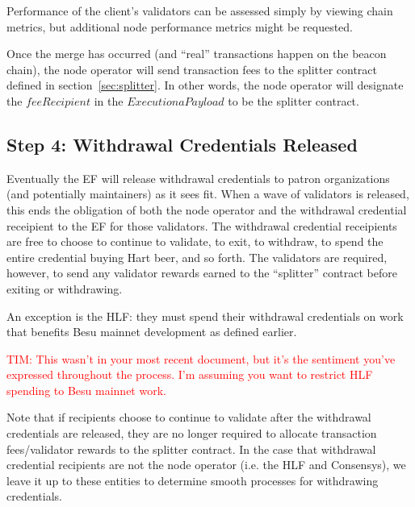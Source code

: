 Performance of the client’s validators can be assessed simply by viewing chain metrics, but additional node performance metrics might be requested.

Once the merge has occurred (and ``real'' transactions happen on the beacon chain), the node operator will send transaction fees to the splitter contract defined in section~\ref{sec:splitter}. In other words, the node operator will designate the $feeRecipient$ in the $ExecutionaPayload$ to be the splitter contract.

\subsection{Step 4:  Withdrawal Credentials Released}
Eventually the EF will release withdrawal credentials to patron organizations (and potentially maintainers) as it sees fit.  When a wave of validators is released, this ends the obligation of both the node operator and the withdrawal credential receipient to the EF for those validators. The withdrawal credential receipients are free to choose to continue to validate, to exit, to withdraw, to spend the entire credential buying Hart beer, and so forth.  The validators are required, however, to send any validator rewards earned to the ``splitter'' contract before exiting or withdrawing.

An exception is the HLF:  they must spend their withdrawal credentials on work that benefits Besu mainnet development as defined earlier.

\textcolor{red}{TIM:  This wasn't in your most recent document, but it's the sentiment you've expressed throughout the process.  I'm assuming you want to restrict HLF spending to Besu mainnet work.}

Note that if recipients choose to continue to validate after the withdrawal credentials are released, they are no longer required to allocate transaction fees/validator rewards to the splitter contract.  In the case that withdrawal credential recipients are not the node operator (i.e. the HLF and Consensys), we leave it up to these entities to determine smooth processes for withdrawing credentials.

